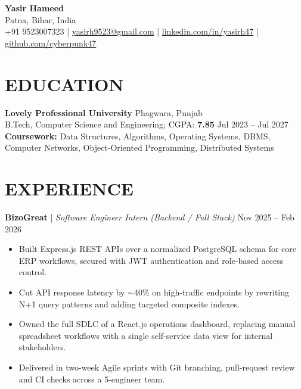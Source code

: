 \documentclass[a4paper,10pt]{article}
\begin{document}
\sloppy

\begin{center}
{\LARGE \textbf{\color{mainblue} Yasir Hameed}} \\[2pt]
Patna, Bihar, India \\[2pt]
+91 9523007323 \quad | \quad \href{mailto:yasirh9523@gmail.com}{\textcolor{mainblue}{yasirh9523@gmail.com}} \quad | \quad \href{https://www.linkedin.com/in/yasirh47/}{\textcolor{mainblue}{linkedin.com/in/yasirh47}} \quad | \quad \href{https://github.com/cyberpunk47}{\textcolor{mainblue}{github.com/cyberpunk47}}
\end{center}

\section*{EDUCATION}
\noindent\textbf{\color{mainblue}Lovely Professional University} \hfill Phagwara, Punjab \\
B.Tech, Computer Science and Engineering; CGPA: \textbf{7.85} \hfill Jul 2023 -- Jul 2027 \\[2pt]
\noindent\textbf{Coursework:} Data Structures, Algorithms, Operating Systems, DBMS, Computer Networks, Object-Oriented Programming, Distributed Systems

\section*{EXPERIENCE}

\noindent\textbf{\color{mainblue}BizoGreat} | \textit{Software Engineer Intern (Backend / Full Stack)} \hfill Nov 2025 -- Feb 2026
\begin{itemize}[leftmargin=1.5em, itemsep=0pt, topsep=1pt, parsep=0pt, partopsep=0pt, label={\textbullet}]
    \item Built Express.js REST APIs over a normalized PostgreSQL schema for core ERP workflows, secured with JWT authentication and role-based access control.
    \item Cut API response latency by $\sim$40\% on high-traffic endpoints by rewriting N+1 query patterns and adding targeted composite indexes.
    \item Owned the full SDLC of a React.js operations dashboard, replacing manual spreadsheet workflows with a single self-service data view for internal stakeholders.
    \item Delivered in two-week Agile sprints with Git branching, pull-request review and CI checks across a 5-engineer team.
\end{itemize}
\end{document}
